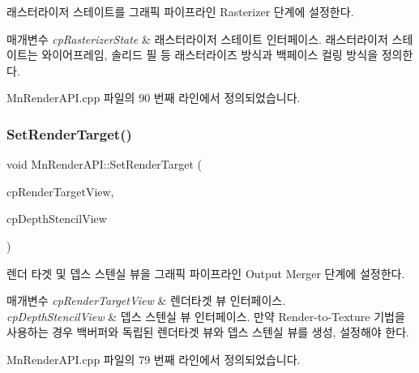래스터라이저 스테이트를 그래픽 파이프라인 Rasterizer 단계에 설정한다. 


\begin{DoxyParams}{매개변수}
{\em cp\+Rasterizer\+State} & 래스터라이저 스테이트 인터페이스.  래스터라이저 스테이트는 와이어프레임, 솔리드 필 등 래스터라이즈 방식과 백페이스 컬링 방식을 정의한다. \\
\hline
\end{DoxyParams}


Mn\+Render\+A\+P\+I.\+cpp 파일의 90 번째 라인에서 정의되었습니다.

\mbox{\label{class_m_n_l_1_1_mn_render_a_p_i_ab9fc7cb2fe9b1dd79b66fe2f169fa46a}} 
\subsubsection{\texorpdfstring{Set\+Render\+Target()}{SetRenderTarget()}}
{\footnotesize\ttfamily void Mn\+Render\+A\+P\+I\+::\+Set\+Render\+Target (\begin{DoxyParamCaption}\item[{const \hyperlink{namespace_m_n_l_aa08a7c0b5ac9d877dacb57b9306b7b8c}{C\+P\+D3\+D\+Render\+Target\+View} \&}]{cp\+Render\+Target\+View,  }\item[{const \hyperlink{namespace_m_n_l_a12b3c209d76ede855300e637f4192a04}{C\+P\+D3\+D\+Depth\+Stencil\+View} \&}]{cp\+Depth\+Stencil\+View }\end{DoxyParamCaption})}



렌더 타겟 및 뎁스 스텐실 뷰을 그래픽 파이프라인 Output Merger 단계에 설정한다. 


\begin{DoxyParams}{매개변수}
{\em cp\+Render\+Target\+View} & 렌더타겟 뷰 인터페이스. \\
\hline
{\em cp\+Depth\+Stencil\+View} & 뎁스 스텐실 뷰 인터페이스.  만약 Render-\/to-\/\+Texture 기법을 사용하는 경우 백버퍼와 독립된 렌더타겟 뷰와 뎁스 스텐실 뷰를 생성, 설정해야 한다. \\
\hline
\end{DoxyParams}


Mn\+Render\+A\+P\+I.\+cpp 파일의 79 번째 라인에서 정의되었습니다.

